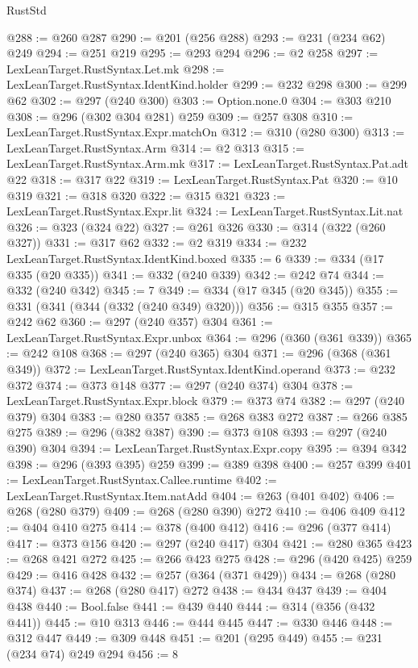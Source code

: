 \begin{lexlean}{RustStd}
\begin{coremodule}
{\begin{coremodule}
{{{{{{{@288 := @260 @287
@290 := @201 (@256 @288)
@293 := @231 (@234 @62) @249
@294 := @251 @219
@295 := @293 @294
@296 := @2 @258
@297 := LexLeanTarget.RustSyntax.Let.mk
@298 := LexLeanTarget.RustSyntax.IdentKind.holder
@299 := @232 @298
@300 := @299 @62
@302 := @297 (@240 @300)
@303 := Option.none.{0}
@304 := @303 @210
@308 := @296 (@302 @304 @281) @259
@309 := @257 @308
@310 := LexLeanTarget.RustSyntax.Expr.matchOn
@312 := @310 (@280 @300)
@313 := LexLeanTarget.RustSyntax.Arm
@314 := @2 @313
@315 := LexLeanTarget.RustSyntax.Arm.mk
@317 := LexLeanTarget.RustSyntax.Pat.adt @22
@318 := @317 @22
@319 := LexLeanTarget.RustSyntax.Pat
@320 := @10 @319
@321 := @318 @320
@322 := @315 @321
@323 := LexLeanTarget.RustSyntax.Expr.lit
@324 := LexLeanTarget.RustSyntax.Lit.nat
@326 := @323 (@324 @22)
@327 := @261 @326
@330 := @314 (@322 (@260 @327))
@331 := @317 @62
@332 := @2 @319
@334 := @232 LexLeanTarget.RustSyntax.IdentKind.boxed
@335 := 6
@339 := @334 (@17 @335 (@20 @335))
@341 := @332 (@240 @339)
@342 := @242 @74
@344 := @332 (@240 @342)
@345 := 7
@349 := @334 (@17 @345 (@20 @345))
@355 := @331 (@341 (@344 (@332 (@240 @349) @320)))
@356 := @315 @355
@357 := @242 @62
@360 := @297 (@240 @357) @304
@361 := LexLeanTarget.RustSyntax.Expr.unbox
@364 := @296 (@360 (@361 @339))
@365 := @242 @108
@368 := @297 (@240 @365) @304
@371 := @296 (@368 (@361 @349))
@372 := LexLeanTarget.RustSyntax.IdentKind.operand
@373 := @232 @372
@374 := @373 @148
@377 := @297 (@240 @374) @304
@378 := LexLeanTarget.RustSyntax.Expr.block
@379 := @373 @74
@382 := @297 (@240 @379) @304
@383 := @280 @357
@385 := @268 @383 @272
@387 := @266 @385 @275
@389 := @296 (@382 @387)
@390 := @373 @108
@393 := @297 (@240 @390) @304
@394 := LexLeanTarget.RustSyntax.Expr.copy
@395 := @394 @342
@398 := @296 (@393 @395) @259
@399 := @389 @398
@400 := @257 @399
@401 := LexLeanTarget.RustSyntax.Callee.runtime
@402 := LexLeanTarget.RustSyntax.Item.natAdd
@404 := @263 (@401 @402)
@406 := @268 (@280 @379)
@409 := @268 (@280 @390) @272
@410 := @406 @409
@412 := @404 @410 @275
@414 := @378 (@400 @412)
@416 := @296 (@377 @414)
@417 := @373 @156
@420 := @297 (@240 @417) @304
@421 := @280 @365
@423 := @268 @421 @272
@425 := @266 @423 @275
@428 := @296 (@420 @425) @259
@429 := @416 @428
@432 := @257 (@364 (@371 @429))
@434 := @268 (@280 @374)
@437 := @268 (@280 @417) @272
@438 := @434 @437
@439 := @404 @438
@440 := Bool.false
@441 := @439 @440
@444 := @314 (@356 (@432 @441))
@445 := @10 @313
@446 := @444 @445
@447 := @330 @446
@448 := @312 @447
@449 := @309 @448
@451 := @201 (@295 @449)
@455 := @231 (@234 @74) @249 @294
@456 := 8
}}}}}}}
\end{coremodule}}
\end{coremodule}
\end{lexlean}
